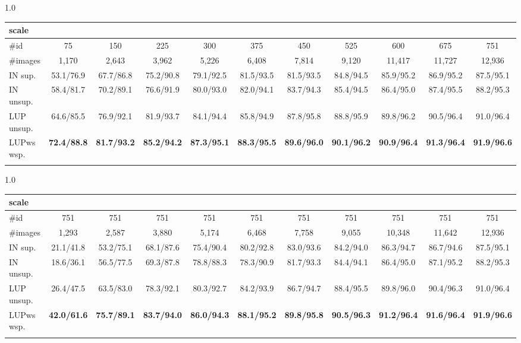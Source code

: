 \documentclass[10pt,twocolumn,letterpaper]{article}
\begin{document}
\begin{table*}[h]
	\setlength{\tabcolsep}{1.8mm}
\small
	\begin{subtable}[h]{1.0\textwidth}
		\centering
		\begin{tabular}{l|cccccccccc}
			\shline
			scale &  &  &  &  &  &  &  &  &  &  \\
			\hline
			\#id & 75 & 150 & 225 & 300 & 375 & 450 & 525 & 600 & 675 & 751 \\ 
			\#images & 1,170 & 2,643 & 3,962 & 5,226 & 6,408 & 7,814 & 9,120 & 11,417 & 11,727 & 12,936 \\
			\hline
			IN sup.   & 53.1/76.9 & 67.7/86.8 & 75.2/90.8 & 79.1/92.5 & 81.5/93.5 & 81.5/93.5 & 84.8/94.5 & 85.9/95.2 & 86.9/95.2 & 87.5/95.1 \\ 
			IN unsup. & 58.4/81.7 & 70.2/89.1 & 76.6/91.9 & 80.0/93.0 & 82.0/94.1 & 83.7/94.3 & 85.4/94.5 & 86.4/95.0 & 87.4/95.5 & 88.2/95.3 \\ 
			LUP unsup.& 64.6/85.5 & 76.9/92.1 & 81.9/93.7 & 84.1/94.4 & 85.8/94.9 & 87.8/95.8 & 88.8/95.9 & 89.8/96.2 & 90.5/96.4 & 91.0/96.4 \\ 
			\hline
			LUPws wsp.& \textbf{72.4/88.8} & \textbf{81.7/93.2} & \textbf{85.2/94.2} & \textbf{87.3/95.1} & \textbf{88.3/95.5} & \textbf{89.6/96.0} & \textbf{90.1/96.2} & \textbf{90.9/96.4} & \textbf{91.3/96.4} & \textbf{91.9/96.6} \\
			\shline
		\end{tabular}
		\vspace{-0.12cm}
		\caption{Market1501 small-scale}
		\label{tab:ss-market}
	\end{subtable}
	
	\begin{subtable}[h]{1.0\textwidth}
		\centering
		\begin{tabular}{l|cccccccccc}
			\shline
			scale &  &  &  &  &  &  &  &  &  &  \\
			\hline
			\#id & 751 & 751 & 751 & 751 & 751 & 751 & 751 & 751 & 751 & 751 \\ 
			\#images & 1,293 & 2,587 & 3,880 & 5,174 & 6,468 & 7,758 & 9,055 & 10,348 & 11,642 & 12,936 \\
			\hline
			IN sup.   & 21.1/41.8 & 53.2/75.1 & 68.1/87.6 & 75.4/90.4 & 80.2/92.8 & 83.0/93.6 & 84.2/94.0 & 86.3/94.7 & 86.7/94.6 & 87.5/95.1 \\ 
			IN unsup. & 18.6/36.1 & 56.5/77.5 & 69.3/87.8 & 78.8/88.3 & 78.3/90.9 & 81.7/93.3 & 84.4/94.1 & 86.4/95.0 & 87.1/95.2 & 88.2/95.3 \\ 
			LUP unsup.& 26.4/47.5 & 63.5/83.0 & 78.3/92.1 & 80.3/92.7 & 84.2/93.9 & 86.7/94.7 & 88.4/95.5 & 89.8/96.0 & 90.4/96.3 & 91.0/96.4 \\ 
			\hline
			LUPws wsp.& \textbf{42.0/61.6} & \textbf{75.7/89.1} & \textbf{83.7/94.0} & \textbf{86.0/94.3} & \textbf{88.1/95.2} & \textbf{89.8/95.8} & \textbf{90.5/96.3} & \textbf{91.2/96.4} & \textbf{91.6/96.4} & \textbf{91.9/96.6} \\
			\shline
		\end{tabular}
		\vspace{-0.12cm}
		\caption{Market1501 few-shot}
		\label{tab:fs-market}
	\end{subtable}
	

\end{table*}
\end{document}
